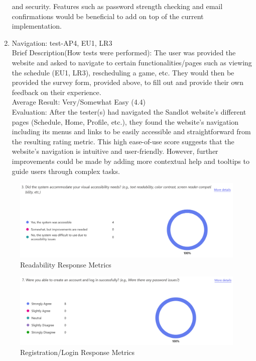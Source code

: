 \documentclass[12pt, titlepage]{article}
\begin{document}
\begin{enumerate}
  and security. Features such as password strength checking and email confirmations would be
  beneficial to add on top of the current implementation.
  \item{Navigation: test-AP4, EU1, LR3\\}
  Brief Description(How tests were performed): The user was provided the website and asked
  to navigate to certain functionalities/pages such as viewing the schedule (EU1, LR3),
  rescheduling a game, etc. They would then be provided the survey form, provided above, to fill
  out and provide their own feedback on their experience. \\
  Average Result: Very/Somewhat Easy (4.4)\\
  Evaluation: After the tester(s) had navigated the Sandlot website's different pages
  (Schedule, Home, Profile, etc.), they found the website's navigation including
  its menus and links to be easily accessible and straightforward from the resulting
  rating metric. This high ease-of-use score suggests that the website's navigation is intuitive
  and user-friendly. However, further improvements could be made by adding more contextual help
  and tooltips to guide users through complex tasks.
\end{enumerate}

\begin{figure}[H]
\centering
\includegraphics[scale=0.6]{survey_responses_visual.png}
\caption{Readability Response Metrics}
\label{visual}
\end{figure}

\begin{figure}[H]
\centering
\includegraphics[scale=0.6]{survey_responses_register_signin.png}
\caption{Registration/Login Response Metrics}
\label{account}
\end{figure}
\end{document}
